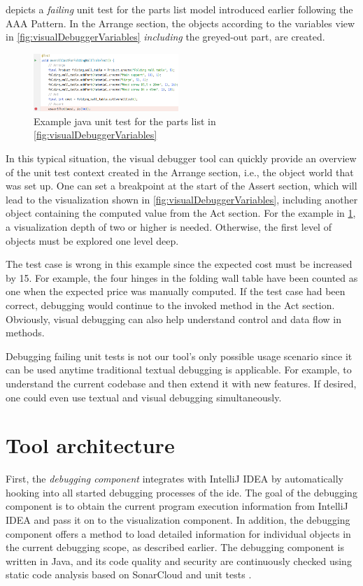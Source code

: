 \documentclass[conference]{IEEEtran}
\newcommand{\intellij}{IntelliJ IDEA}
\begin{document}
 depicts a \textit{failing} unit test for the parts list model introduced earlier following the AAA Pattern.
In the Arrange section, the objects according to the variables view in \cref{fig:visualDebuggerVariables} \textit{including} the greyed-out part, are created.

\begin{figure}[h]
    \centering
    \includegraphics[width=0.488\textwidth]{images/example.png}
    \caption{Example java unit test for the parts list in \cref{fig:visualDebuggerVariables}}
    \label{fig:exampleUnitTest}
\end{figure}

In this typical situation, the visual debugger tool can quickly provide an overview of the unit test context created in the Arrange section, i.e., the object world that was set up.
One can set a breakpoint at the start of the Assert section, which will lead to the visualization shown in \cref{fig:visualDebuggerVariables}, including another object containing the computed value from the Act section.
For the example in \cref{fig:exampleUnitTest}, a visualization depth of two or higher is needed.
Otherwise, the first level of objects must be explored one level deep.

The test case is wrong in this example since the expected cost must be increased by 15.
For example, the four hinges in the folding wall table have been counted as one when the expected price was manually computed.
If the test case had been correct, debugging would continue to the invoked method in the Act section.
Obviously, visual debugging can also help understand control and data flow in methods.

Debugging failing unit tests is not our tool's only possible usage scenario since it can be used anytime traditional textual debugging is applicable.
For example, to understand the current codebase and then extend it with new features. 
If desired, one could even use textual and visual debugging simultaneously.

\section{Tool architecture}  \label{sec:architecture}
First, the \textit{debugging component} integrates with \intellij{} by automatically hooking into all started debugging processes of the \gls*{ide}.
The goal of the debugging component is to obtain the current program execution information from \intellij{} and pass it on to the visualization component.
In addition, the debugging component offers a method to load detailed information for individual objects in the current debugging scope, as described earlier.
The debugging component is written in Java, and its code quality and security are continuously checked using static code analysis based on SonarCloud and unit tests \cite{timkrauterArtifactsICSME2022}.
\end{document}
